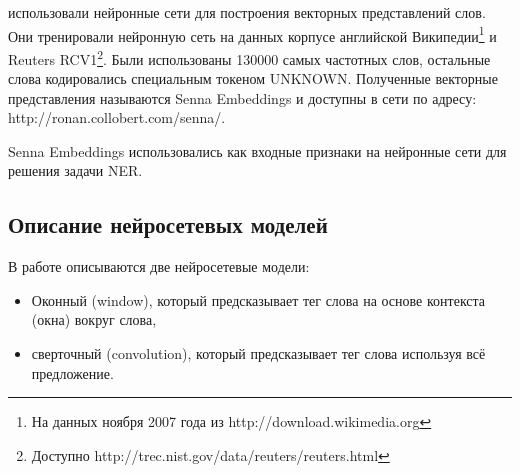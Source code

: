   \citep{collobert2011natural} использовали нейронные сети для построения векторных представлений слов.
  Они тренировали нейронную сеть на данных корпусе английской
  Википедии\footnote{На данных ноября 2007 года из http://download.wikimedia.org}
  и Reuters RCV1\footnote{Доступно http://trec.nist.gov/data/reuters/reuters.html}.
  Были использованы 130000 самых частотных слов, остальные слова кодировались
  специальным токеном UNKNOWN.
  Полученные векторные представления называются Senna Embeddings и доступны в сети
  по адресу: http://ronan.collobert.com/senna/.

  Senna Embeddings использовались как входные признаки на нейронные сети для решения задачи NER.

  \subsection{Описание нейросетевых моделей} \label{subsection:nn}

  В работе \citep{collobert2011natural} описываются две нейросетевые модели:
  \begin{itemize}
  \item Оконный (window), который предсказывает тег слова на основе контекста (окна) вокруг слова,
  \item сверточный (convolution), который предсказывает тег слова используя всё предложение.
  \end{itemize}

